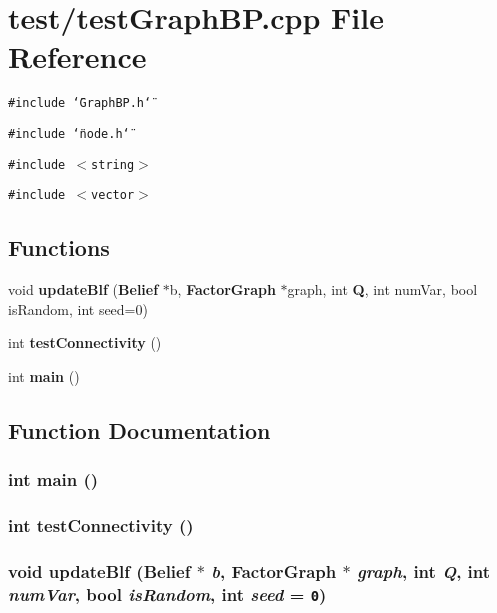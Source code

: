 \section{test/testGraphBP.cpp File Reference}
\label{testGraphBP_8cpp}
{\tt \#include \char`\"{}GraphBP.h\char`\"{}}\par
{\tt \#include \char`\"{}node.h\char`\"{}}\par
{\tt \#include $<$string$>$}\par
{\tt \#include $<$vector$>$}\par
\subsection*{Functions}
\begin{CompactItemize}
\item 
void {\bf updateBlf} ({\bf Belief} $\ast$b, {\bf FactorGraph} $\ast$graph, int {\bf Q}, int numVar, bool isRandom, int seed=0)
\item 
int {\bf testConnectivity} ()
\item 
int {\bf main} ()
\end{CompactItemize}


\subsection{Function Documentation}
\subsubsection{\setlength{\rightskip}{0pt plus 5cm}int main ()}\label{testGraphBP_8cpp_446c6b9a1a4dbab517fbb760870458a3}


\subsubsection{\setlength{\rightskip}{0pt plus 5cm}int testConnectivity ()}\label{testGraphBP_8cpp_9054a4b945ccde8aef46003499258553}


\subsubsection{\setlength{\rightskip}{0pt plus 5cm}void updateBlf ({\bf Belief} $\ast$ {\em b}, {\bf FactorGraph} $\ast$ {\em graph}, int {\em Q}, int {\em numVar}, bool {\em isRandom}, int {\em seed} = {\tt 0})}\label{testGraphBP_8cpp_d27bc5ccc52b288c4b0db53c1163b425}


